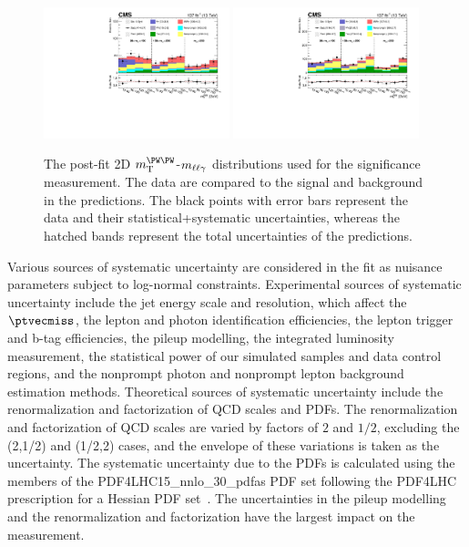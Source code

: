 \begin{figure}[htp]
     \centering      
      \includegraphics[width=0.48\textwidth]{unblind_SRCR/2D_fit/aa_0jetsrun2.pdf}
      \includegraphics[width=0.48\textwidth]{unblind_SRCR/2D_fit/aa_1morejetsrun2.pdf}
    \caption{The post-fit 2D $\mTWW$-$m_{\ell\ell\gamma}$ distributions used for the significance measurement. The data are compared to the signal and background in the predictions. The black points with error bars represent the data and their statistical+systematic uncertainties, whereas the hatched bands represent the total uncertainties of the predictions.}
        \label{fig:2dfitrun2}
     
\end{figure}

Various sources of systematic uncertainty are considered in the fit as nuisance parameters subject to log-normal constraints. Experimental sources of systematic uncertainty include the jet energy scale and resolution, which affect the $\ptvecmiss$, the lepton and photon identification efficiencies, the lepton trigger and b-tag efficiencies, the pileup modelling, the integrated luminosity measurement, the statistical power of our simulated samples and data control regions, and the nonprompt photon and nonprompt lepton background estimation methods. Theoretical sources of systematic uncertainty include the renormalization and factorization of QCD scales and PDFs. The renormalization and factorization of QCD scales are varied by factors of $2$ and $1/2$, excluding the (2,1/2) and (1/2,2) cases, and the envelope of these variations is taken as the uncertainty. The systematic uncertainty due to the PDFs is calculated using the members of the PDF4LHC15\_nnlo\_30\_pdfas PDF set following the PDF4LHC prescription for a Hessian PDF set~\cite{Butterworth_2016,Harland_Lang_2015,Ball_2015,PhysRevD.93.033006}. The uncertainties in the pileup modelling and the renormalization and factorization have the largest impact on the measurement.

